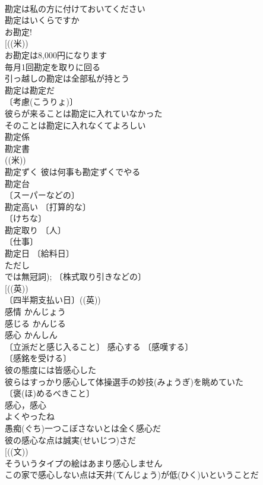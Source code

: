\documentclass[8pt]{extreport}
\begin{document}
\begin{CJK}{UTF8}{min}
\\	勘定は私の方に付けておいてください 
\\	勘定はいくらですか 
\\	お勘定! 
\\	[((米))
\\	お勘定は8,000円になります 
\\	毎月1回勘定を取りに回る 
\\	引っ越しの勘定は全部私が持とう 
\\	勘定は勘定だ 
\\	〔考慮(こうりょ)〕
\\	彼らが来ることは勘定に入れていなかった 
\\	そのことは勘定に入れなくてよろしい 
\\	勘定係 
\\	勘定書 
\\	((米)) 
\\	勘定ずく 彼は何事も勘定ずくでやる 
\\	勘定台 
\\	〔スーパーなどの〕
\\	勘定高い 〔打算的な〕
\\	〔けちな〕
\\	勘定取り 〔人〕
\\	〔仕事〕
\\	勘定日 〔給料日〕
\\	ただし
\\	では無冠詞); 〔株式取り引きなどの〕
\\	[((英)) 
\\	〔四半期支払い日〕((英)) 
\\	感情	かんじょう	
\\	感じる	かんじる	
\\	感心	かんしん	
\\	〔立派だと感じ入ること〕 感心する 〔感嘆する〕
\\	〔感銘を受ける〕
\\	彼の態度には皆感心した 
\\	彼らはすっかり感心して体操選手の妙技(みょうぎ)を眺めていた 
\\	〔褒(ほ)めるべきこと〕
\\	感心，感心
\\	よくやったね 
\\	愚痴(ぐち)一つこぼさないとは全く感心だ 
\\	彼の感心な点は誠実(せいじつ)さだ 
\\	[((文)) 
\\	そういうタイプの絵はあまり感心しません 
\\	この家で感心しない点は天井(てんじょう)が低(ひく)いということだ 

\end{CJK}
\end{document}
